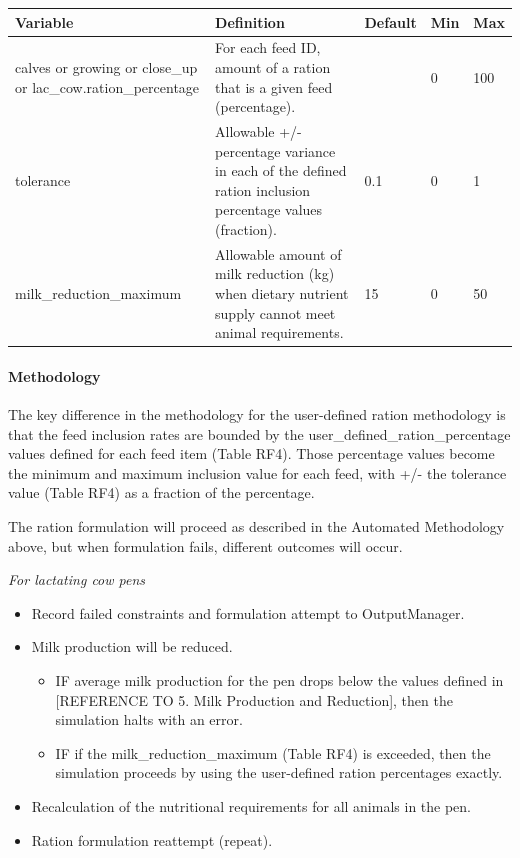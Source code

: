 \begin{refsection}
\begin{landscape}
\begin{table}[h!]
\begin{tabular}{@{} L{3.5cm} L{5.5cm} L{4.5cm} C{2cm} C{2cm} @{}}

\toprule
\textbf{Variable} & \textbf{Definition} & \textbf{Default} & \textbf{Min} & \textbf{Max} \\
\midrule

calves or growing or close\_up or lac\_cow.ration\_percentage & For each feed ID, amount of a ration that is a given feed (percentage). &  & 0 & 100 \\

tolerance & Allowable +/- percentage variance in each of the defined ration inclusion percentage values (fraction). & 0.1 & 0 & 1 \\

milk\_reduction\_maximum & Allowable amount of milk reduction (kg) when dietary nutrient supply cannot meet animal requirements. & 15 & 0 & 50 \\

\bottomrule

\end{tabular}
\end{table}

\end{landscape}


\paragraph{Methodology}
The key difference in the methodology for the user-defined ration methodology is that the feed inclusion rates are bounded by the user\_defined\_ration\_percentage values defined for each feed item (Table RF4). Those percentage values become the minimum and maximum inclusion value for each feed, with +/- the tolerance value (Table RF4) as a fraction of the percentage.

The ration formulation will proceed as described in the Automated Methodology above, but when formulation fails, different outcomes will occur.


\textit{For lactating cow pens}
\begin{itemize}
    \item Record failed constraints and formulation attempt to OutputManager.
    \item Milk production will be reduced.
    \begin{itemize}
        \item IF average milk production for the pen drops below the values defined in [REFERENCE TO 5. Milk Production and Reduction], then the simulation halts with an error.
        \item IF if the milk\_reduction\_maximum (Table RF4) is exceeded, then the simulation proceeds by using the user-defined ration percentages exactly.
    \end{itemize}
    \item Recalculation of the nutritional requirements for all animals in the pen.
    \item Ration formulation reattempt (repeat).
\end{itemize}


\end{refsection}
